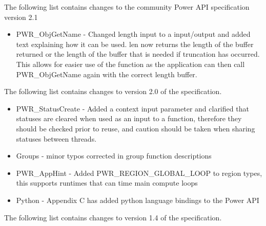 The following list contains changes to the community Power API specification version 2.1
\begin{itemize}
  \item{PWR_ObjGetName - Changed length input to a input/output and added text explaining how it can be used.
         len now returns the length of the buffer returned or the length of the buffer that is needed if 
         truncation has occurred. This allows for easier use of the function as the application can then call PWR_ObjGetName again with the correct length buffer.}

\end{itemize}


The following list contains changes to version 2.0 of the specification.
\begin{itemize}
  \item{PWR_StatusCreate - Added a context input parameter and clarified that statuses are cleared when used as an input to a function, therefore they should be checked prior to reuse, and caution should be taken when sharing statuses between threads.}
  \item{Groups - minor typos corrected in group function descriptions}
  \item{PWR_AppHint - Added PWR_REGION_GLOBAL_LOOP to region types, this supports runtimes that can time main compute loops}
  \item{Python - Appendix C has added python language bindings to the Power API}

\end{itemize}


The following list contains changes to version 1.4 of the specification.

